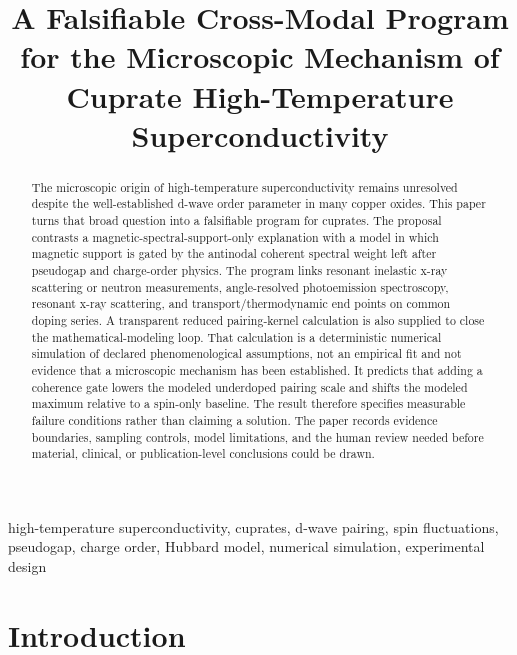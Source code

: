\documentclass[conference]{IEEEtran}
\begin{document}
\title{A Falsifiable Cross-Modal Program for the Microscopic Mechanism of Cuprate High-Temperature Superconductivity}

\author{
}

\maketitle

\begin{abstract}
The microscopic origin of high-temperature superconductivity remains unresolved despite the well-established d-wave order parameter in many copper oxides. This paper turns that broad question into a falsifiable program for cuprates. The proposal contrasts a magnetic-spectral-support-only explanation with a model in which magnetic support is gated by the antinodal coherent spectral weight left after pseudogap and charge-order physics. The program links resonant inelastic x-ray scattering or neutron measurements, angle-resolved photoemission spectroscopy, resonant x-ray scattering, and transport/thermodynamic end points on common doping series. A transparent reduced pairing-kernel calculation is also supplied to close the mathematical-modeling loop. That calculation is a deterministic numerical simulation of declared phenomenological assumptions, not an empirical fit and not evidence that a microscopic mechanism has been established. It predicts that adding a coherence gate lowers the modeled underdoped pairing scale and shifts the modeled maximum relative to a spin-only baseline. The result therefore specifies measurable failure conditions rather than claiming a solution. The paper records evidence boundaries, sampling controls, model limitations, and the human review needed before material, clinical, or publication-level conclusions could be drawn.
\end{abstract}

\begin{IEEEkeywords}
high-temperature superconductivity, cuprates, d-wave pairing, spin fluctuations, pseudogap, charge order, Hubbard model, numerical simulation, experimental design
\end{IEEEkeywords}

\section{Introduction}
\end{document}
